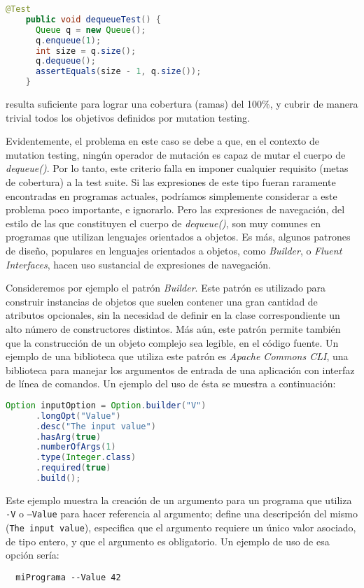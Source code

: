 \begin{center}
	\begin{lstlisting}[frame=tlrb, mathescape=true, language=Java]
    @Test
    public void dequeueTest() {
      Queue q = new Queue();
      q.enqueue(1);
      int size = q.size();
      q.dequeue();
      assertEquals(size - 1, q.size());
    }
	\end{lstlisting}
\end{center}
resulta suficiente para lograr una cobertura (ramas) del 100\%, y cubrir de manera trivial todos los objetivos definidos por mutation testing.

Evidentemente, el problema en este caso se debe a que, en el contexto de mutation testing, ning\'un operador de mutaci\'on es capaz de mutar el cuerpo de \emph{dequeue()}. Por lo tanto, este criterio falla en imponer cualquier requisito (metas de cobertura) a la test suite. Si las expresiones de este tipo fueran raramente encontradas en programas actuales, podr\'iamos simplemente considerar a este problema poco importante, e ignorarlo. Pero las expresiones de navegaci\'on, del estilo de las que constituyen el cuerpo de \emph{dequeue()}, son muy comunes en programas que utilizan lenguajes orientados a objetos. Es m\'as, algunos patrones de dise\~no, populares en lenguajes orientados a objetos, como \emph{Builder}, o \emph{Fluent Interfaces}, hacen uso sustancial de expresiones de navegaci\'on.

Consideremos por ejemplo el patr\'on \emph{Builder}. Este patr\'on es utilizado para construir instancias de objetos que suelen contener una gran cantidad de atributos opcionales, sin la necesidad de definir en la clase correspondiente un alto n\'umero de constructores distintos. M\'as a\'un, este patr\'on permite tambi\'en que la construcci\'on de un objeto complejo sea legible, en el c\'odigo fuente. Un ejemplo de una biblioteca que utiliza este patr\'on es \emph{Apache Commons CLI}, una biblioteca para manejar los argumentos de entrada de una aplicaci\'on con interfaz de l\'inea de comandos. Un ejemplo del uso de \'esta se muestra a continuaci\'on:
\begin{center}
	\begin{lstlisting}[mathescape=true, language=Java,showstringspaces=false]
    Option inputOption = Option.builder("V")
      .longOpt("Value")
      .desc("The input value")
      .hasArg(true)
      .numberOfArgs(1)
      .type(Integer.class)
      .required(true)
      .build();
	\end{lstlisting}
\end{center}
Este ejemplo muestra la creaci\'on de un argumento para un programa que utiliza \texttt{-V} o \texttt{--Value} para hacer referencia al argumento; define una descripci\'on del mismo (\texttt{The input value}), especifica que el argumento requiere un \'unico valor asociado, de tipo entero, y que el argumento es obligatorio. Un ejemplo de uso de esa opci\'on ser\'ia:
\begin{lstlisting}
  miPrograma --Value 42
\end{lstlisting}

